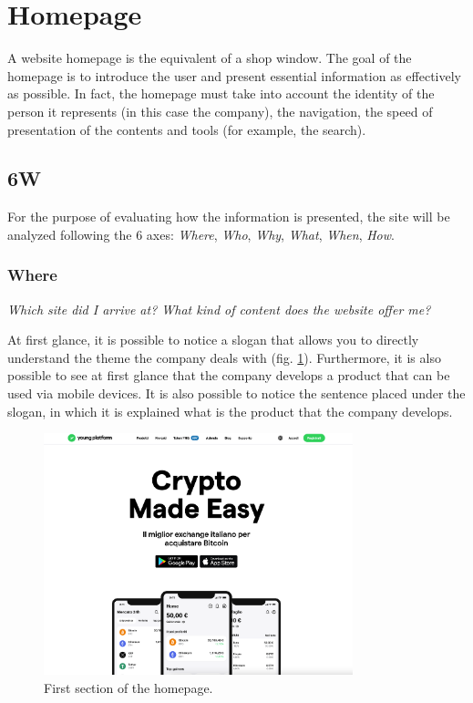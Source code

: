 \section{Homepage}

A website homepage is the equivalent of a shop window. The goal of the 
homepage is to introduce the user and present essential information as 
effectively as possible. In fact, the homepage must take into account the 
identity of the person it represents (in this case the company), the 
navigation, the speed of presentation of the contents and tools 
(for example, the search).

\subsection{6W}

For the purpose of evaluating how the information is presented, the site 
will be analyzed following the 6 axes: \textit{Where}, \textit{Who}, 
\textit{Why}, \textit{What}, \textit{When}, \textit{How}. 

\subsubsection{Where}

\centerline{\textit{Which site did I arrive at? What kind of content does 
the website offer me?}}
At first glance, it is possible to notice a slogan that allows you to 
directly understand the theme the company deals with 
(fig. \ref{fig:homepage-1}). Furthermore, it is also possible to see at 
first glance that the company develops a product that can be used via 
mobile devices. It is also possible to notice the sentence placed under 
the slogan, in which it is explained what is the product that the company 
develops.

\begin{figure}[H]
	\centering
	\includegraphics[width=0.80\textwidth]{res/images/homepage-1.png}
	\caption{First section of the homepage.}
	\label{fig:homepage-1}
\end{figure}


